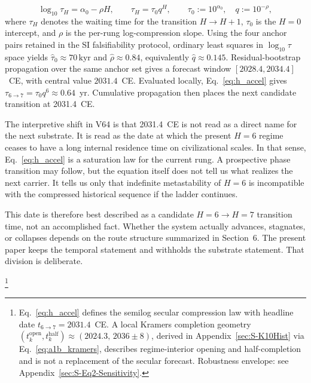 \documentclass[11pt]{article}
\newcommand{\topen}{t_k^{\mathrm{open}}}
\newcommand{\thalf}{t_k^{\mathrm{half}}}
\begin{document}
\begin{equation}
\log_{10}\tau_H = \alpha_0 - \rho H,
\qquad
\tau_H = \tau_0 q^H,
\qquad
\tau_0 := 10^{\alpha_0},
\quad
q := 10^{-\rho},
\label{eq:h_accel}
\end{equation}
where \(\tau_H\) denotes the waiting time for the transition
\(H\to H+1\),
\(\tau_0\) is the \(H{=}0\) intercept,
and \(\rho\) is the per-rung log-compression slope.
Using the four anchor pairs retained in the SI falsifiability protocol,
ordinary least squares in
\(\log_{10}\tau\)
space yields
\(\hat{\tau}_0\approx 70\,\mathrm{kyr}\)
and
\(\hat{\rho}\approx 0.84\),
equivalently
\(\hat q\approx 0.145\).
Residual-bootstrap propagation over the same anchor set gives a forecast window
\([2028.4,2034.4]\)~CE,
with central value
\(2031.4\)~CE.
Evaluated locally,
Eq.~\eqref{eq:h_accel} gives
\(\tau_{6\to 7}=\tau_0q^6\approx 0.64\)~yr.
Cumulative propagation then places the next candidate transition at 2031.4~CE.

The interpretive shift in V64 is that 2031.4~CE is not read as a direct name for the next substrate.
It is read as the date at which the present \(H{=}6\) regime ceases to have a long internal residence time on civilizational scales.
In that sense,
Eq.~\eqref{eq:h_accel} is a saturation law for the current rung.
A prospective phase transition may follow,
but the equation itself does not tell us what realizes the next carrier.
It tells us only that indefinite metastability of \(H{=}6\) is incompatible with the compressed historical sequence if the ladder continues.

This date is therefore best described as a candidate
\(H{=}6\to H{=}7\)
transition time,
not an accomplished fact.
Whether the system actually advances,
stagnates,
or collapses depends on the route structure summarized in Section~6.
The present paper keeps the temporal statement and withholds the substrate statement.
That division is deliberate.

\footnote{Eq.~\eqref{eq:h_accel} defines the semilog secular compression law with headline date
\(t_{6\to 7}=2031.4\)~CE.
A local Kramers completion geometry
\((\topen,\thalf)\approx(2024.3,\,2036\pm 8)\),
derived in Appendix~\ref{sec:S-K10Hist} via Eq.~\eqref{eq:a1b_kramers},
describes regime-interior opening and half-completion and is not a replacement of the secular forecast.
Robustness envelope:
see Appendix~\ref{sec:S-Eq2-Sensitivity}.}
\end{document}
